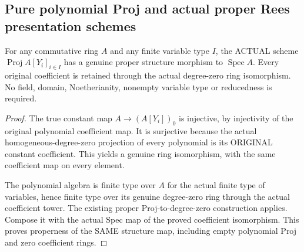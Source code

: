 \subsection{Pure polynomial Proj and actual proper Rees presentation schemes}
\begin{theorem}
\label{scheme:actual-polynomial-proj-proper}
\leanok
For any commutative ring $A$ and any finite variable type $I$, the ACTUAL
scheme $\operatorname{Proj}A[Y_i]_{i\in I}$ has a genuine proper structure
morphism to $\operatorname{Spec}A$. Every original coefficient is retained
through the actual degree-zero ring isomorphism. No field, domain,
Noetherianity, nonempty variable type or reducedness is required.
\end{theorem}
\begin{proof}
The true constant map $A\to(A[Y_i])_0$ is injective, by injectivity of the
original polynomial coefficient map. It is surjective because the actual
homogeneous-degree-zero projection of every polynomial is its ORIGINAL
constant coefficient. This yields a genuine ring isomorphism, with the same
coefficient map on every element.

The polynomial algebra is finite type over $A$ for the actual finite type
of variables, hence finite type over its genuine degree-zero ring through
the actual coefficient tower. The existing proper Proj-to-degree-zero
construction applies. Compose it with the actual Spec map of the proved
coefficient isomorphism. This proves properness of the SAME structure map,
including empty polynomial Proj and zero coefficient rings.
\end{proof}

